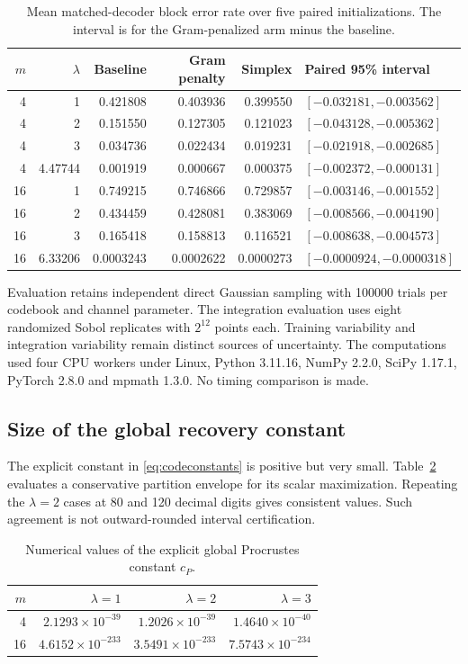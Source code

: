 \documentclass[11pt]{article}
\theoremstyle{remark}\newtheorem{remark}[theorem]{Remark}
\begin{document}
\begin{table}[htbp]
\centering\small
\caption{Mean matched-decoder block error rate over five paired initializations.
The interval is for the Gram-penalized arm minus the baseline.}
\label{tab:learning}
\begin{tabular}{rrrrrl}
\toprule
$m$ & $\lambda$ & Baseline & Gram penalty & Simplex & Paired 95\% interval\\
\midrule
4 & 1 & 0.421808 & 0.403936 & 0.399550 & $[-0.032181,-0.003562]$\\
4 & 2 & 0.151550 & 0.127305 & 0.121023 & $[-0.043128,-0.005362]$\\
4 & 3 & 0.034736 & 0.022434 & 0.019231 & $[-0.021918,-0.002685]$\\
4 & 4.47744 & 0.001919 & 0.000667 & 0.000375 & $[-0.002372,-0.000131]$\\
16 & 1 & 0.749215 & 0.746866 & 0.729857 & $[-0.003146,-0.001552]$\\
16 & 2 & 0.434459 & 0.428081 & 0.383069 & $[-0.008566,-0.004190]$\\
16 & 3 & 0.165418 & 0.158813 & 0.116521 & $[-0.008638,-0.004573]$\\
16 & 6.33206 & 0.0003243 & 0.0002622 & 0.0000273 & $[-0.0000924,-0.0000318]$\\
\bottomrule
\end{tabular}
\end{table}

Evaluation retains independent direct Gaussian sampling with 100000 trials
per codebook and channel parameter. The integration evaluation uses eight
randomized Sobol replicates with $2^{12}$ points each.
Training variability and integration variability remain distinct sources of uncertainty.
The computations used four CPU workers under Linux, Python 3.11.16,
NumPy 2.2.0, SciPy 1.17.1, PyTorch 2.8.0 and mpmath 1.3.0.
No timing comparison is made.

\subsection{Size of the global recovery constant}
The explicit constant in \eqref{eq:codeconstants} is positive but very small.
Table~\ref{tab:global-constant} evaluates a conservative partition envelope
for its scalar maximization. Repeating the $\lambda=2$ cases at 80 and 120
decimal digits gives consistent values. Such agreement is not outward-rounded
interval certification.

\begin{table}[htbp]
\centering
\caption{Numerical values of the explicit global Procrustes constant $c_P$.}
\label{tab:global-constant}
\begin{tabular}{rrrr}
\toprule
$m$ & $\lambda=1$ & $\lambda=2$ & $\lambda=3$\\
\midrule
4 & $2.1293\times10^{-39}$ & $1.2026\times10^{-39}$ & $1.4640\times10^{-40}$\\
16 & $4.6152\times10^{-233}$ & $3.5491\times10^{-233}$ & $7.5743\times10^{-234}$\\
\bottomrule
\end{tabular}
\end{table}
\end{document}
